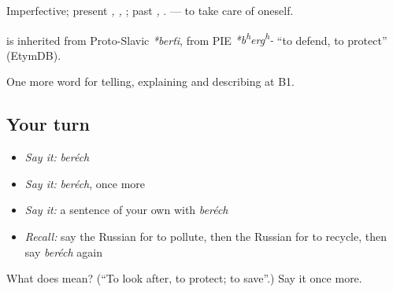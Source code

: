 Imperfective; present \emph{, , }; past \emph{, }. \emph{ } — to take care of oneself.

\begin{cousinweb}
\textbf{} is inherited from Proto-Slavic \emph{*berťi}, from PIE \emph{*b\textsuperscript{h}erg\textsuperscript{h}-} \textquotedblleft{}to defend, to protect\textquotedblright{} (EtymDB).
\end{cousinweb}

\begin{grammarlens}[title={What you've built}]
One more word for telling, explaining and describing at B1.
\end{grammarlens}

\subsection*{Your turn}
\begin{itemize}
\raggedright
  \item \emph{Say it:} \emph{beréch}
  \item \emph{Say it:} \emph{beréch}, once more
  \item \emph{Say it:} a sentence of your own with \emph{beréch}
  \item \emph{Recall:} say the Russian for to pollute, then the Russian for to recycle, then say \emph{beréch} again
\end{itemize}

\begin{tcolorbox}[breakable,colback=teal!4,colframe=teal!35!black,title={Before you move on}]
What does  mean? (\textquotedblleft{}To look after, to protect; to save\textquotedblright{}.) Say it once more.
\end{tcolorbox}
